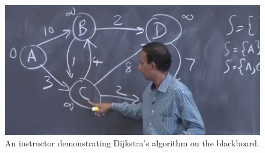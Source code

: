 \begin{figure}
\begin{center}
\includegraphics[width=0.7\columnwidth]{img/6006/dijkstra.png}
\end{center}

\caption{An instructor demonstrating Dijkstra's algorithm on the
blackboard.}

\label{fig:6006-dijkstra}
\end{figure}

